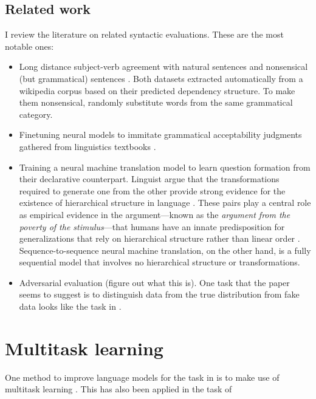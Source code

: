 \subsection{Related work}
I review the literature on related syntactic evaluations. These are the most notable ones:
\begin{itemize}
  \item Long distance subject-verb agreement with natural sentences \citep{Linzen+2016:LSTM-syntax,Kuncoro+2018:RNNG-deps,} and nonsensical (but grammatical) sentences \citep{Gulordava+2018:colorless-green}. Both datasets extracted automatically from a wikipedia corpus based on their predicted dependency structure. To make them nonsensical, \citet{Gulordava+2018:colorless-green} randomly substitute words from the same grammatical category.
  \item Finetuning neural models to immitate grammatical acceptability judgments gathered from linguistics textbooks \citet{DBLP:journals/corr/abs-1805-12471}.
  \item Training a neural machine translation model to learn question formation from their declarative counterpart\cite{McCoy+2018:RNN-pos}. Linguist argue that the transformations required to generate one from the other provide strong evidence for the existence of hierarchical structure in language \cite{Everaert+2015:structures}. These pairs play a central role as empirical evidence in the argument---known as the \textit{argument from the poverty of the stimulus}---that humans have an innate predisposition for generalizations that rely on hierarchical structure rather than linear order \citep{chomsky1980rules}. Sequence-to-sequence neural machine translation, on the other hand, is a fully sequential model that involves no hierarchical structure or transformations.
  \item Adversarial evaluation \citep{Smith2012:adversarial} (figure out what this is). One task that the paper seems to suggest is to distinguish data from the true distribution from fake data looks like the task in \citet{Linzen+2018:targeted}.
\end{itemize}


\section{Multitask learning}
One method to improve language models for the task in \citet{Linzen+2016:LSTM-syntax} is to make use of multitask learning \citep{Enguehard+2017:RNN-multitask}. This has also been applied in the task of \citet{}

